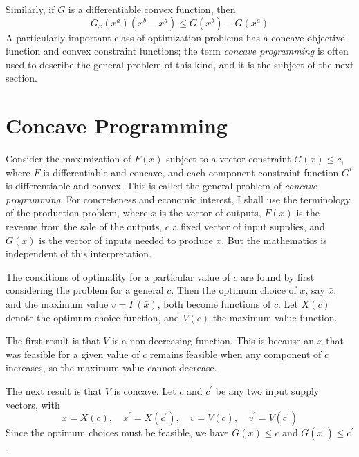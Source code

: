 Similarly, if $G$ is a differentiable convex function, then
\begin{equation} \label{equa7.2}
  G_x(x^a)(x^b - x^a) \leq G(x^b) - G(x^a)
\end{equation}
A particularly important class of optimization problems has a concave objective function and convex constraint functions; the term \textit{concave programming} is often used to describe the general problem of this kind, and it is the subject of the next section.

\section*{Concave Programming}

Consider the maximization of $F(x)$ subject to a vector constraint $G(x) \leq c$, where $F$ is differentiable and concave, and each component constraint function $G^i$ is differentiable and convex. This is called the general problem of \textit{concave programming}. For concreteness and economic interest, I shall use the terminology of the production problem, where $x$ is the vector of outputs, $F(x)$ is the revenue from the sale of the outputs, $c$ a fixed vector of input supplies, and $G(x)$ is the vector of inputs needed to produce $x$. But the mathematics is independent of this interpretation.

The conditions of optimality for a particular value of $c$ are found by first considering the problem for a general $c$. Then the optimum choice of $x$, say $\bar{x}$, and the maximum value $v = F (\bar{x})$, both become functions of $c$. Let $X(c)$ denote the optimum choice
function, and $V(c)$ the maximum value function.

The first result is that $V$ is a non-decreasing function. This is because an $x$ that was feasible for a given value of $c$ remains feasible
when any component of $c$ increases, so the maximum value cannot decrease.

The next result is that $V$ is concave. Let $c$ and $c^\prime$ be any two input supply vectors, with
\begin{equation*}
\bar{x} = X(c), \quad \bar{x}^\prime = X(c^\prime), \quad \bar{v} =V(c), \quad \bar{v}^\prime = V(c^\prime)
\end{equation*}
Since the optimum choices must be feasible, we have $G(\bar{x}) \leq c$ and $G(\bar{x}^\prime) \leq c^\prime$.

